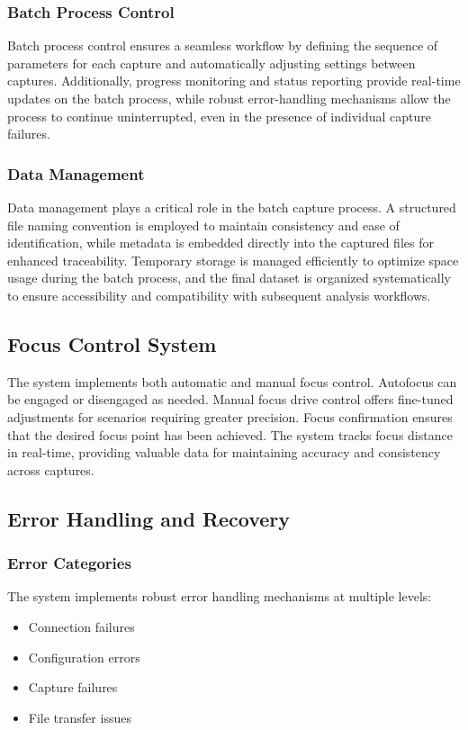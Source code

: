 \subsubsection{Batch Process Control}
 Batch process control ensures a seamless workflow by defining the sequence of parameters for each capture and automatically adjusting settings between captures. Additionally, progress monitoring and status reporting provide real-time updates on the batch process, while robust error-handling mechanisms allow the process to continue uninterrupted, even in the presence of individual capture failures.

\subsubsection{Data Management}
Data management plays a critical role in the batch capture process. A structured file naming convention is employed to maintain consistency and ease of identification, while metadata is embedded directly into the captured files for enhanced traceability. Temporary storage is managed efficiently to optimize space usage during the batch process, and the final dataset is organized systematically to ensure accessibility and compatibility with subsequent analysis workflows.

\subsection{Focus Control System}

The system implements both automatic and manual focus control. Autofocus can be engaged or disengaged as needed. Manual focus drive control offers fine-tuned adjustments for scenarios requiring greater precision. Focus confirmation ensures that the desired focus point has been achieved. The system tracks focus distance in real-time, providing valuable data for maintaining accuracy and consistency across captures.

\subsection{Error Handling and Recovery}

\subsubsection{Error Categories}
The system implements robust error handling mechanisms at multiple levels:

\begin{itemize}
    \item Connection failures
    \item Configuration errors
    \item Capture failures
    \item File transfer issues
\end{itemize}

